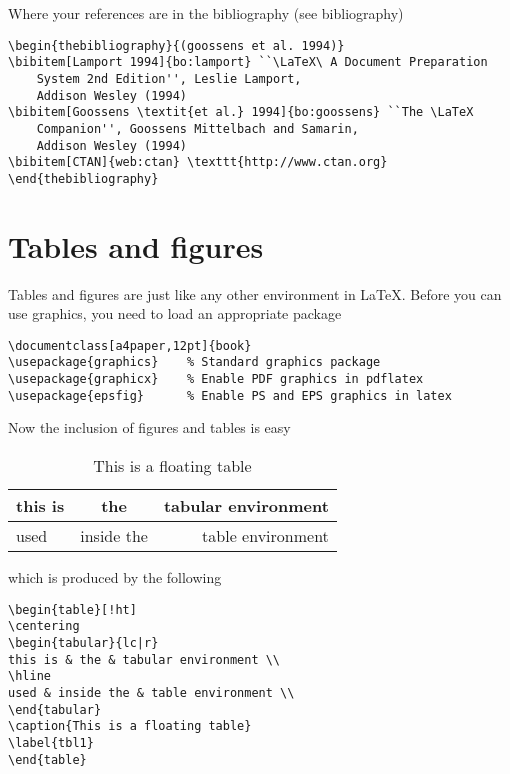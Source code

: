 \documentclass[12pt, a4paper]{book}
\begin{document}
Where your references are in the bibliography (see bibliography)
\begin{center}
\begin{minipage}[t]{14.5cm}
\begin{verbatim}
\begin{thebibliography}{(goossens et al. 1994)}
\bibitem[Lamport 1994]{bo:lamport} ``\LaTeX\ A Document Preparation
    System 2nd Edition'', Leslie Lamport,
    Addison Wesley (1994)
\bibitem[Goossens \textit{et al.} 1994]{bo:goossens} ``The \LaTeX
    Companion'', Goossens Mittelbach and Samarin,
    Addison Wesley (1994)
\bibitem[CTAN]{web:ctan} \texttt{http://www.ctan.org}
\end{thebibliography}
\end{verbatim}
\end{minipage}
\end{center}



\section*{Tables and figures}
Tables and figures are just like any other environment in \LaTeX.  Before you can use graphics, you need to load an appropriate package
\begin{center}
\begin{minipage}[t]{14.5cm}
\begin{verbatim}
\documentclass[a4paper,12pt]{book}
\usepackage{graphics}    % Standard graphics package
\usepackage{graphicx}    % Enable PDF graphics in pdflatex
\usepackage{epsfig}      % Enable PS and EPS graphics in latex
\end{verbatim}
\end{minipage}
\end{center}

Now the inclusion of figures and tables is easy
\begin{table}[!ht]
\centering
\begin{tabular}{lc|r}
this is & the & tabular environment \\
\hline
used & inside the & table environment \\
\end{tabular}
\caption{This is a floating table}
\label{tbl1}
\end{table}
which is produced by the following
\begin{verbatim}
\begin{table}[!ht]
\centering
\begin{tabular}{lc|r}
this is & the & tabular environment \\
\hline
used & inside the & table environment \\
\end{tabular}
\caption{This is a floating table}
\label{tbl1}
\end{table}
\end{verbatim}
\end{document}
